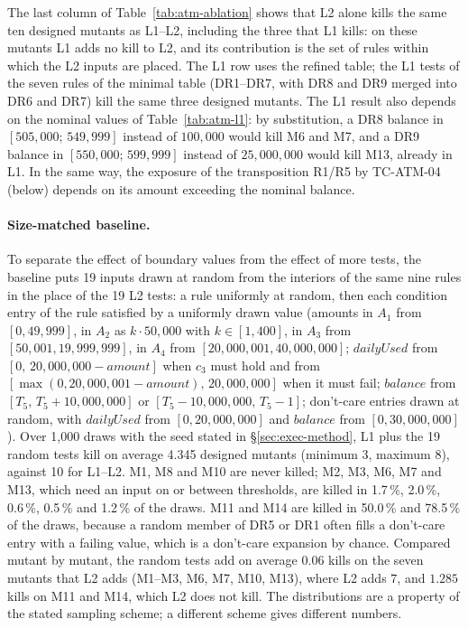 \documentclass[11pt,a4paper]{article}
\begin{document}
The last column of Table~\ref{tab:atm-ablation} shows that L2 alone kills
the same ten designed mutants as L1--L2, including the three that L1 kills:
on these mutants L1 adds no kill to L2, and its contribution is the set of
rules within which the L2 inputs are placed. The L1 row uses the refined
table; the L1 tests of the seven rules of the minimal table (DR1--DR7, with
DR8 and DR9 merged into DR6 and DR7) kill the same three designed mutants.
The L1 result also depends on the nominal values of
Table~\ref{tab:atm-l1}: by substitution, a DR8 balance in
\([505{,}000;\,549{,}999]\) instead of \(100{,}000\) would kill M6 and M7,
and a DR9 balance in \([550{,}000;\,599{,}999]\) instead of
\(25{,}000{,}000\) would kill M13, already in L1. In the same way, the exposure of the transposition R1/R5 by TC-ATM-04 (below) depends on its amount exceeding the nominal balance.

\paragraph{Size-matched baseline.} To separate the effect of boundary values
from the effect of more tests, the baseline puts 19 inputs drawn at random from the interiors of the same nine rules in the place of the 19 L2 tests: a rule uniformly
at random, then each condition entry of the rule satisfied by a uniformly
drawn value (amounts in \(A_1\) from \([0,49{,}999]\), in \(A_2\) as
\(k\cdot50{,}000\) with \(k\in[1,400]\), in \(A_3\) from
\([50{,}001,19{,}999{,}999]\), in \(A_4\) from \([20{,}000{,}001,40{,}000{,}000]\);
\(\mathit{dailyUsed}\) from \([0,\,20{,}000{,}000-\mathit{amount}]\) when \(c_3\)
must hold and from \([\max(0,20{,}000{,}001-\mathit{amount}),\,20{,}000{,}000]\)
when it must fail; \(\mathit{balance}\) from \([T_5,\,T_5+10{,}000{,}000]\) or
\([T_5-10{,}000{,}000,\,T_5-1]\); don't-care entries drawn at random, with
\(\mathit{dailyUsed}\) from \([0,20{,}000{,}000]\) and \(\mathit{balance}\) from
\([0,30{,}000{,}000]\)). Over 1{,}000 draws with the seed stated in \S\ref{sec:exec-method}, L1 plus the 19 random tests kill on average 4.345 designed mutants
(minimum 3, maximum 8), against 10 for L1--L2. M1, M8 and M10 are never
killed; M2, M3, M6, M7 and M13, which need an input on or between thresholds,
are killed in 1.7\,\%, 2.0\,\%, 0.6\,\%, 0.5\,\% and 1.2\,\% of the draws. M11
and M14 are killed in 50.0\,\% and 78.5\,\% of the draws, because a random
member of DR5 or DR1 often fills a don't-care entry with a failing value,
which is a don't-care expansion by chance. Compared mutant by mutant, the random tests add on average \(0.06\) kills on the seven mutants that L2 adds (M1--M3, M6, M7, M10, M13), where L2 adds \(7\), and \(1.285\) kills on M11 and M14, which L2 does not kill. The distributions are a property
of the stated sampling scheme; a different scheme gives different numbers.
\end{document}
